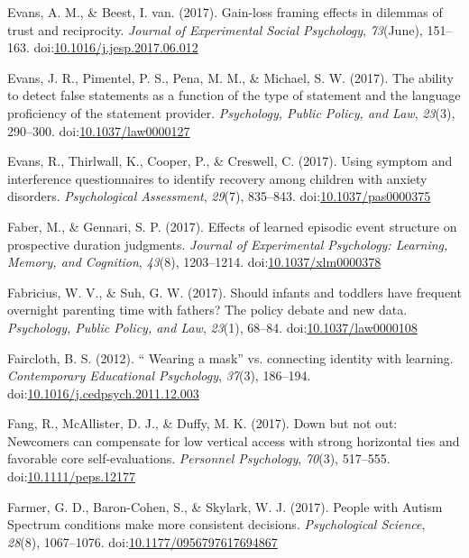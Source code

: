 \documentclass[english,man]{apa6}
\theoremstyle{definition}
\theoremstyle{definition}
\theoremstyle{definition}
\theoremstyle{remark}
\begin{document}
\hypertarget{ref-Evans2017a}{}
Evans, A. M., \& Beest, I. van. (2017). Gain-loss framing effects in
dilemmas of trust and reciprocity. \emph{Journal of Experimental Social
Psychology}, \emph{73}(June), 151--163.
doi:\href{https://doi.org/10.1016/j.jesp.2017.06.012}{10.1016/j.jesp.2017.06.012}

\hypertarget{ref-Evans2017c}{}
Evans, J. R., Pimentel, P. S., Pena, M. M., \& Michael, S. W. (2017).
The ability to detect false statements as a function of the type of
statement and the language proficiency of the statement provider.
\emph{Psychology, Public Policy, and Law}, \emph{23}(3), 290--300.
doi:\href{https://doi.org/10.1037/law0000127}{10.1037/law0000127}

\hypertarget{ref-Evans2017}{}
Evans, R., Thirlwall, K., Cooper, P., \& Creswell, C. (2017). Using
symptom and interference questionnaires to identify recovery among
children with anxiety disorders. \emph{Psychological Assessment},
\emph{29}(7), 835--843.
doi:\href{https://doi.org/10.1037/pas0000375}{10.1037/pas0000375}

\hypertarget{ref-Faber2017}{}
Faber, M., \& Gennari, S. P. (2017). Effects of learned episodic event
structure on prospective duration judgments. \emph{Journal of
Experimental Psychology: Learning, Memory, and Cognition}, \emph{43}(8),
1203--1214.
doi:\href{https://doi.org/10.1037/xlm0000378}{10.1037/xlm0000378}

\hypertarget{ref-Fabricius2017}{}
Fabricius, W. V., \& Suh, G. W. (2017). Should infants and toddlers have
frequent overnight parenting time with fathers? The policy debate and
new data. \emph{Psychology, Public Policy, and Law}, \emph{23}(1),
68--84.
doi:\href{https://doi.org/10.1037/law0000108}{10.1037/law0000108}

\hypertarget{ref-Faircloth2012}{}
Faircloth, B. S. (2012). `` Wearing a mask'' vs. connecting identity
with learning. \emph{Contemporary Educational Psychology}, \emph{37}(3),
186--194.
doi:\href{https://doi.org/10.1016/j.cedpsych.2011.12.003}{10.1016/j.cedpsych.2011.12.003}

\hypertarget{ref-Fang2017}{}
Fang, R., McAllister, D. J., \& Duffy, M. K. (2017). Down but not out:
Newcomers can compensate for low vertical access with strong horizontal
ties and favorable core self-evaluations. \emph{Personnel Psychology},
\emph{70}(3), 517--555.
doi:\href{https://doi.org/10.1111/peps.12177}{10.1111/peps.12177}

\hypertarget{ref-Farmer2017}{}
Farmer, G. D., Baron-Cohen, S., \& Skylark, W. J. (2017). People with
Autism Spectrum conditions make more consistent decisions.
\emph{Psychological Science}, \emph{28}(8), 1067--1076.
doi:\href{https://doi.org/10.1177/0956797617694867}{10.1177/0956797617694867}
\end{document}
